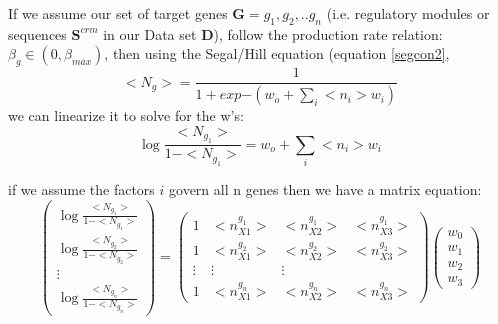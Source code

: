 If we assume our set of target genes $\textbf{G}= {g_1,g_2,..g_n}$  (i.e. regulatory modules or sequences $\textbf{S}^{crm}$ in our Data set $\textbf{D}$), follow the production rate relation: $\beta_g \in (0,\beta_{max})$,  then using the Segal/Hill equation (equation \ref{segcon2},
 \begin{equation}\label{}
    <N_{g}> = \frac{1}{1 + exp{-(w_o +\sum_i<n_i>w_i)}}
 \end{equation}
 we can linearize it to solve for the w's:
 \begin{equation}\label{}
    \log{\frac{<N_{g_1}>}{1-<N_{g_1}>}} = w_o +\sum_i<n_i>w_i
 \end{equation}

 if we assume the factors $i$ govern all n genes then we have a matrix equation:
\[
\begin{pmatrix} \log{\frac{<N_{g_1}>}{1-<N_{g_1}>}}\\ \log{\frac{<N_{g_2}>}{1-<N_{g_2}>}} \\ \vdots \\  \log{\frac{<N_{g_n}>}{1-<N_{g_n}>}}\end{pmatrix}=
 \begin{pmatrix}
   1& <n_{X1}^{g_1}> & <n_{X2}^{g_1}> & <n_{X3}^{g_1}>  \\
   1&<n_{X1}^{g_2}> & <n_{X2}^{g_2}> & <n_{X3}^{g_2}> \\
    \vdots & \vdots & \vdots \\
   1&<n_{X1}^{g_n}> & <n_{X2}^{g_n}> & <n_{X3}^{g_n}>
 \end{pmatrix} \begin{pmatrix} w_0 \\ w_1 \\ w_2 \\ w_3 \end{pmatrix}
\]
